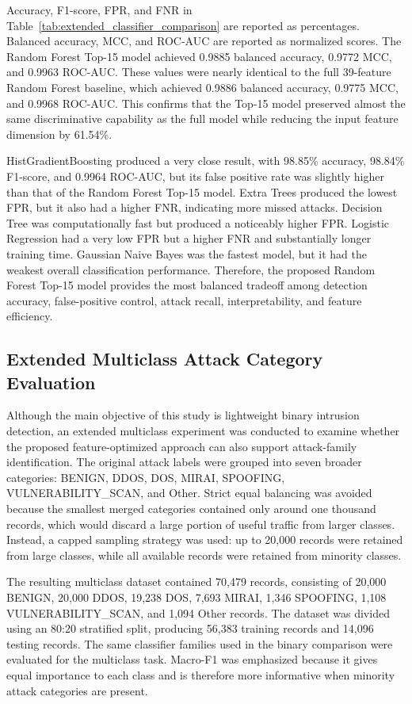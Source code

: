\documentclass[journal]{IEEEtran}
\begin{document}
Accuracy, F1-score, FPR, and FNR in Table~\ref{tab:extended_classifier_comparison} are reported as percentages. Balanced accuracy, MCC, and ROC-AUC are reported as normalized scores. The Random Forest Top-15 model achieved 0.9885 balanced accuracy, 0.9772 MCC, and 0.9963 ROC-AUC. These values were nearly identical to the full 39-feature Random Forest baseline, which achieved 0.9886 balanced accuracy, 0.9775 MCC, and 0.9968 ROC-AUC. This confirms that the Top-15 model preserved almost the same discriminative capability as the full model while reducing the input feature dimension by 61.54\%.

HistGradientBoosting produced a very close result, with 98.85\% accuracy, 98.84\% F1-score, and 0.9964 ROC-AUC, but its false positive rate was slightly higher than that of the Random Forest Top-15 model. Extra Trees produced the lowest FPR, but it also had a higher FNR, indicating more missed attacks. Decision Tree was computationally fast but produced a noticeably higher FPR. Logistic Regression had a very low FPR but a higher FNR and substantially longer training time. Gaussian Naive Bayes was the fastest model, but it had the weakest overall classification performance. Therefore, the proposed Random Forest Top-15 model provides the most balanced tradeoff among detection accuracy, false-positive control, attack recall, interpretability, and feature efficiency.

\subsection{Extended Multiclass Attack Category Evaluation}

Although the main objective of this study is lightweight binary intrusion detection, an extended multiclass experiment was conducted to examine whether the proposed feature-optimized approach can also support attack-family identification. The original attack labels were grouped into seven broader categories: BENIGN, DDOS, DOS, MIRAI, SPOOFING, VULNERABILITY\_SCAN, and Other. Strict equal balancing was avoided because the smallest merged categories contained only around one thousand records, which would discard a large portion of useful traffic from larger classes. Instead, a capped sampling strategy was used: up to 20,000 records were retained from large classes, while all available records were retained from minority classes.

The resulting multiclass dataset contained 70,479 records, consisting of 20,000 BENIGN, 20,000 DDOS, 19,238 DOS, 7,693 MIRAI, 1,346 SPOOFING, 1,108 VULNERABILITY\_SCAN, and 1,094 Other records. The dataset was divided using an 80:20 stratified split, producing 56,383 training records and 14,096 testing records. The same classifier families used in the binary comparison were evaluated for the multiclass task. Macro-F1 was emphasized because it gives equal importance to each class and is therefore more informative when minority attack categories are present.
\end{document}
